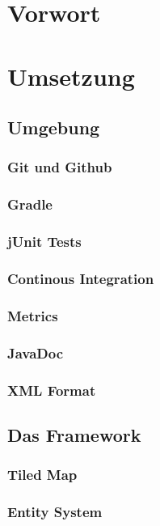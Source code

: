 \section{Vorwort}
\section{Umsetzung}
	\subsection{Umgebung}
		\subsubsection{Git und Github}
		\subsubsection{Gradle}
		\subsubsection{jUnit Tests}
		\subsubsection{Continous Integration}
		\subsubsection{Metrics}
		\subsubsection{JavaDoc}
		\subsubsection{XML Format}
	\subsection{Das Framework}
		\subsubsection{Tiled Map}
		\subsubsection{Entity System}
